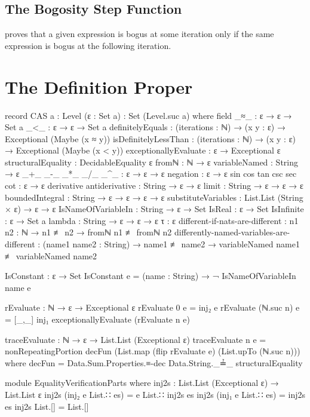 \documentclass{report}
\begin{document}
\subsection{The Bogosity Step Function}
 proves that a given expression is bogus at some iteration only if the same expression is bogus at the following iteration.

\section{The Definition Proper}

\begin{code}
record CAS {a : Level} (ε : Set a) : Set (Level.suc a) where
  field
    _≈_ : ε → ε → Set a
    _<_ : ε → ε → Set a
    definitelyEquals : (iterations : ℕ) →
                       (x y : ε) →
                       Exceptional (Maybe (x ≈ y))
    isDefinitelyLessThan : (iterations : ℕ) →
                           (x y : ε) →
                           Exceptional (Maybe (x < y))
    exceptionallyEvaluate : ε → Exceptional ε
    structuralEquality : DecidableEquality ε
    fromℕ : ℕ → ε
    variableNamed : String → ε
    _+_
     _-_
     _*_
     _/_
     _^_ : ε → ε → ε
    negation : ε → ε
    sin
     cos
     tan
     csc
     sec
     cot : ε → ε
    derivative
     antiderivative : String → ε → ε
    limit : String → ε → ε → ε
    boundedIntegral : String → ε → ε → ε → ε
    substituteVariables : List.List (String × ε) → ε → ε
    IsNameOfVariableIn : String → ε → Set
    IsReal : ε → Set
    IsInfinite : ε → Set a
    lambda : String → ε → ε → ε
    τ : ε
    different-if-nats-are-different :
      {n1 n2 : ℕ} → n1 ≢ n2 → fromℕ n1 ≢ fromℕ n2
    differently-named-variables-are-different :
      (name1 name2 : String) →
      name1 ≢ name2 →
      variableNamed name1 ≢ variableNamed name2

  IsConstant : ε → Set
  IsConstant e = (name : String) → ¬ IsNameOfVariableIn name e

  rEvaluate : ℕ → ε → Exceptional ε
  rEvaluate 0 e = inj₂ e
  rEvaluate (ℕ.suc n) e = [_,_] inj₁ exceptionallyEvaluate (rEvaluate n e)

  traceEvaluate : ℕ → ε → List.List (Exceptional ε)
  traceEvaluate n e =
    nonRepeatingPortion decFun (List.map (flip rEvaluate e) (List.upTo (ℕ.suc n)))
      where decFun = Data.Sum.Properties.≡-dec Data.String._≟_ structuralEquality

  module EqualityVerificationParts where
    inj2s : List.List (Exceptional ε) → List.List ε
    inj2s (inj₂ e List.∷ es) = e List.∷ inj2s es
    inj2s (inj₁ e List.∷ es) = inj2s es
    inj2s List.[] = List.[]


\end{code}
\end{document}

